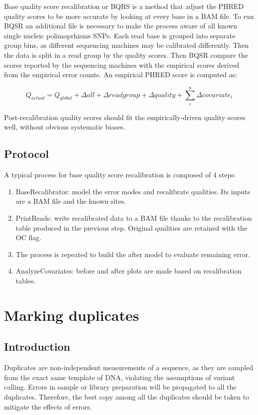 		Base quality score recalibration or BQRS is a method that adjust the PHRED quality scores to be more accurate by looking at every base in a BAM file.
		To run BQSR an additional file is necessary to make the process aware of all known single nucleic polimoprhisms SNPs.
		Each read base is grouped into separate group bins, as different sequencing machines may be calibrated differently.
		Then the data is split in a read group by the quality scores.
		Then BQSR compare the scores reported by the sequencing machines with the empirical scores derived from the empirical error counts.
		An empirical PHRED score is computed as:

		$$Q_{actual} = Q_{global} + \Delta all + \Delta readgroup + \Delta quality + \sum\limits_i^n \Delta covariate_i$$

		Post-recalibration quality scores should fit the empirically-driven quality scores well, without obvious systematic biases.

	\subsection{Protocol}
	A typical process for base quality score recalibration is composed of $4$ steps:

	\begin{multicols}{2}
		\begin{enumerate}
			\item BaseRecalibrator: model the error modes and recalibrate qualities.
				Its inputs are a BAM file and the known sites.
			\item PrintReads: write recalibrated data to a BAM file thanks to the recalibration table produced in the previous step.
				Original qualities are retained with the OC flag.
			\item The process is repeated to build the after model to evaluate remaining error.
			\item AnalyzeCovariates: before and after plots are made based on recalibration tables.
		\end{enumerate}
	\end{multicols}

\section{Marking duplicates}

	\subsection{Introduction}
	Duplicates are non-independent measurements of a sequence, as they are sampled from the exact same template of DNA, violating the assumptions of variant calling.
	Errors in sample or library preparation will be propagated to all the duplicates.
	Therefore, the best copy among all the duplicates should be taken to mitigate the effects of errors.

